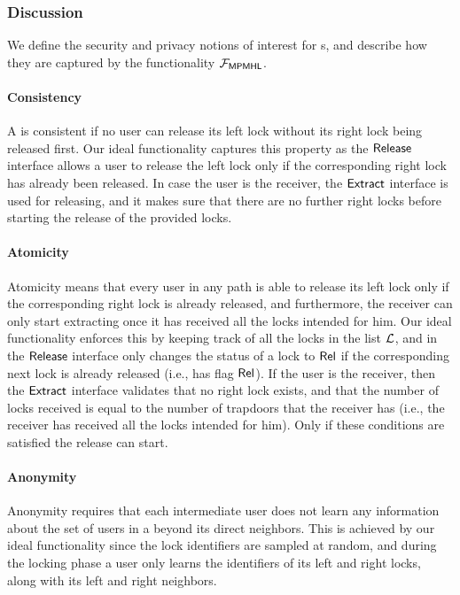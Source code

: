\subsubsection{Discussion}
\label{sec:mpmhl-discussion}

We define the security and privacy notions of interest for {\sysname}s, and describe how they 
are captured by the functionality $\mathcal{F}_{\mathsf{MPMHL}}$.


\paragraph{Consistency} A \sysname is consistent if no user can release its left lock without its 
right lock being released first. Our ideal functionality captures this property as the $\mathsf{Release}$ 
interface allows a user to release the left lock only if the corresponding right lock has already 
been released. In case the user is the receiver, the $\mathsf{Extract}$ interface is used for releasing, 
and it makes sure that there are no further right locks before starting the release of the provided 
locks.


\paragraph{Atomicity} Atomicity means that every user in any path is able to release its left lock 
only if the corresponding right lock is already released, and furthermore, the receiver can only start extracting once it has received all the locks intended for him. Our ideal functionality enforces this by 
keeping track of all the locks in the list $\mathcal{L}$, and in the $\mathsf{Release}$ interface only changes the 
status of a lock to $\mathsf{Rel}$ if the corresponding next lock is already released (i.e., has flag $\mathsf{Rel}$). 
If the user is the receiver, then the $\mathsf{Extract}$ interface validates that no right lock exists, and that the number of locks received is equal to the number of trapdoors that the receiver has (i.e., the receiver has received all the locks intended for him). Only if these conditions are satisfied the release can start.

\paragraph{Anonymity} Anonymity requires that each intermediate user does not learn any information 
about the set of users in a \sysname beyond its direct neighbors.
This is achieved by our ideal functionality since the lock identifiers are sampled at random, and 
during the locking phase a user only learns the identifiers of its left and right locks, along with 
its left and right neighbors.

